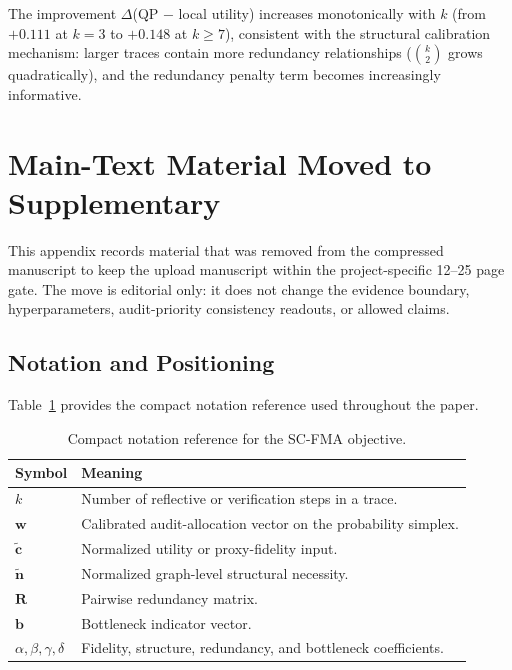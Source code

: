 \documentclass[a4paper,fleqn]{cas-sc}
\begin{document}
The improvement $\Delta$(QP $-$ local utility) increases monotonically with $k$ (from $+0.111$ at $k=3$ to $+0.148$ at $k \ge 7$), consistent with the structural calibration mechanism: larger traces contain more redundancy relationships ($\binom{k}{2}$ grows quadratically), and the redundancy penalty term becomes increasingly informative.

\section{Main-Text Material Moved to Supplementary}
\label{app:moved-main-material}

This appendix records material that was removed from the compressed manuscript to keep the upload manuscript within the project-specific 12--25 page gate. The move is editorial only: it does not change the evidence boundary, hyperparameters, audit-priority consistency readouts, or allowed claims.

\subsection{Notation and Positioning}
\label{app:notation-positioning}

Table~\ref{tab:supp-notation} provides the compact notation reference used throughout the paper.

\begin{table}[ht]
\caption{Compact notation reference for the SC-FMA objective.}
\label{tab:supp-notation}
\centering
\small
\begin{tabular}{ll}
\toprule
\textbf{Symbol} & \textbf{Meaning} \\
\midrule
$k$ & Number of reflective or verification steps in a trace. \\
$\mathbf{w}$ & Calibrated audit-allocation vector on the probability simplex. \\
$\tilde{\mathbf{c}}$ & Normalized utility or proxy-fidelity input. \\
$\tilde{\mathbf{n}}$ & Normalized graph-level structural necessity. \\
$\mathbf{R}$ & Pairwise redundancy matrix. \\
$\mathbf{b}$ & Bottleneck indicator vector. \\
$\alpha,\beta,\gamma,\delta$ & Fidelity, structure, redundancy, and bottleneck coefficients. \\
\bottomrule
\end{tabular}
\end{table}
\end{document}
